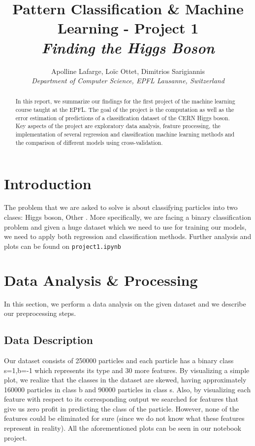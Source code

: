 \documentclass[10pt,conference,compsocconf]{IEEEtran}
\begin{document}
\title{Pattern Classification \& Machine Learning - Project 1 \\ \textit{Finding the Higgs Boson}}

\author{
  Apolline Lafarge, Lo{\"i}c Ottet, Dimitrios Sarigiannis\\
  \textit{Department of Computer Science, EPFL Lausanne, Switzerland}
}

\maketitle

\begin{abstract}
In this report, we summarize our findings for the first project of the machine learning course taught at the EPFL. The goal of the project is the computation as well as the error estimation of predictions of a classification dataset of the CERN Higgs boson. Key aspects of the project are exploratory data analysis, feature processing, the implementation of several regression and classification machine learning methods and the comparison of different models using cross-validation.
\end{abstract}

\section*{Introduction}
The problem that we are asked to solve is about classifying particles into two clases: {Higgs boson, Other} . More specifically, we are facing a binary classification problem and given a huge dataset which we need to use for training our models, we need to apply both regression and classification methods.
Further analysis and plots can be found on  \verb|project1.ipynb|
\section{Data Analysis \& Processing}
In this section, we perform a data analysis on the given dataset and we describe our preprocessing steps.
\subsection{Data Description}
Our dataset consists of 250000 particles and each particle has a binary class {s=1,b=-1} which represents its type and 30 more features. By visualizing a simple plot, we realize that the classes in the dataset are skewed, having approximately 160000 particles in class b and 90000 particles in class s. Also, by visualizing each feature with respect to its corresponding output we searched for features that give us zero profit in predicting the class of the particle. However, none of the features could be eliminated for sure (since we do not know what these features represent in reality). All the aforementioned plots can be seen in our notebook project.
\end{document}
